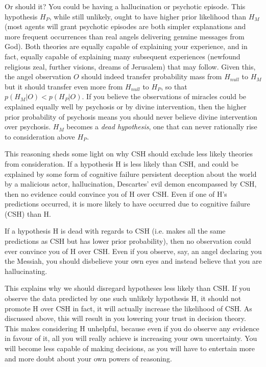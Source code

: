 \documentclass{article}
\begin{document}
Or should it? You could be having a hallucination or psychotic episode. This hypothesis \(H_{P}\), while still unlikely, ought to have higher prior likelihood than \(H_{M}\) (most agents will grant psychotic episodes are both simpler explanations and more frequent occurrences than real angels delivering genuine messages from God). Both theories are equally capable of explaining your experience, and in fact, equally capable of explaining many subsequent experiences (newfound religious zeal, further visions, dreams of Jerusalem) that may follow. Given this, the angel observation \(O\) should indeed transfer probability mass from \(H_{null}\) to \(H_{M}\) \textemdash{} but it should transfer even more from \(H_{null}\) to \(H_{P}\), so that \(p(H_{M}|O)<p(H_{P}|O)\). If you believe the observations of miracles could be explained equally well by psychosis or by divine intervention, then the higher prior probability of psychosis means you should never believe divine intervention over psychosis. \(H_{M}\) becomes a \textit{dead hypothesis}, one that can never rationally rise to consideration above \(H_{P}\).

This reasoning sheds some light on why CSH should exclude less likely theories from consideration. If a hypothesis H is less likely than CSH, and could be explained by some form of cognitive failure \textemdash{} persistent deception about the world by a malicious actor, hallucination, Descartes' evil demon \textemdash{} encompassed by CSH, then no evidence could convince you of H over CSH. Even if one of H's predictions occurred, it is more likely to have occurred due to cognitive failure (CSH) than H. 

If a hypothesis H is dead with regards to CSH (i.e. makes all the same predictions as CSH but has lower prior probability), then no observation could ever convince you of H over CSH. Even if you observe, say, an angel declaring you the Messiah, you should disbelieve your own eyes and instead believe that you are hallucinating.

This explains why we should disregard hypotheses less likely than CSH. If you observe the data predicted by one such unlikely hypothesis H, it should not promote H over CSH \textemdash{} in fact, it will actually increase the likelihood of CSH. As discussed above, this will result in you lowering your trust in decision theory. This makes considering H unhelpful, because even if you do observe any evidence in favour of it, all you will really achieve is increasing your own uncertainty. You will become less capable of making decisions, as you will have to entertain more and more doubt about your own powers of reasoning.
\end{document}
